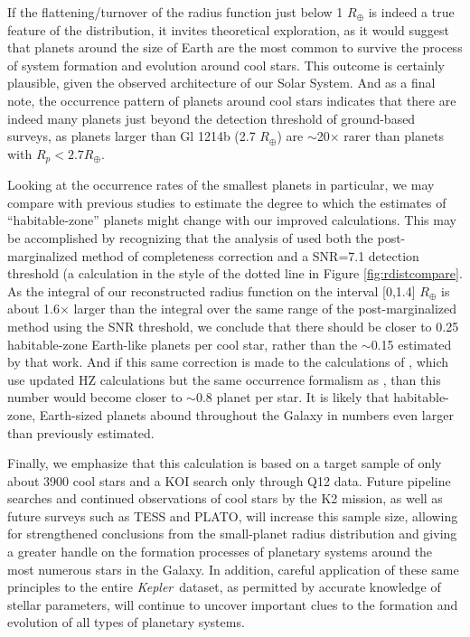 \documentclass[iop]{emulateapj}
\def\Kepler{\textit{Kepler}}
\def\Rearth{R_\oplus}
\begin{document}
If the flattening/turnover of the radius function just below 1 $\Rearth$ is indeed a true feature of the distribution, it invites theoretical exploration, as it would suggest that planets around the size of Earth are the most common to survive the process of system formation and evolution around cool stars.  This outcome is certainly plausible, given the observed architecture of our Solar System.   And as a final note, the occurrence pattern of planets around cool stars indicates that there are indeed many planets just beyond the detection threshold of ground-based surveys, as planets larger than Gl 1214b (2.7 $\Rearth$) are $\sim$20$\times$ rarer than planets with $R_p < 2.7 \Rearth$.

Looking at the occurrence rates of the smallest planets in particular, we may compare with previous studies to estimate the degree to which the estimates of ``habitable-zone'' planets might change with our improved calculations.  This may be accomplished by recognizing that the analysis of \citet{dressing2013} used both the post-marginalized method of completeness correction and a SNR=7.1 detection threshold (a calculation in the style of the dotted line in Figure \ref{fig:rdistcompare}.  As the integral of our reconstructed radius function on the interval [0,1.4] $\Rearth$ is about 1.6$\times$ larger than the integral over the same range of the post-marginalized method using the SNR threshold, we conclude that there should be closer to 0.25 habitable-zone Earth-like planets per cool star, rather than the $\sim$0.15 estimated by that work. And if this same correction is made to the calculations of \citet{kopparapu2013b}, which use updated HZ calculations but the same occurrence formalism as \citet{dressing2013}, than this number would become closer to $\sim$0.8 planet per star.  It is likely that habitable-zone, Earth-sized planets abound throughout the Galaxy in numbers even larger than previously estimated.


Finally, we emphasize that this calculation is based on a target sample of only about 3900 cool stars and a KOI search only through Q12 data.  Future pipeline searches and continued observations of cool stars by the K2 mission, as well as future surveys such as TESS and PLATO, will increase this sample size, allowing for strengthened conclusions from the small-planet radius distribution and giving a greater handle on the formation processes of planetary systems around the most numerous stars in the Galaxy.  In addition, careful application of these same principles to the entire \Kepler\ dataset, as permitted by accurate knowledge of stellar parameters, will continue to uncover important clues to the formation and evolution of all types of planetary systems.
\end{document}
